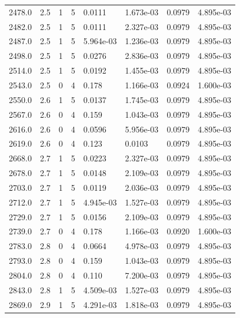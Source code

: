\documentclass[preview]{standalone}
\begin{document}
{{{{\begin{tabular}{L{1.2cm}C{1.2cm} C{0.3cm}C{0.5cm} C{1.4cm}C{1.4cm} C{1.4cm}C{1.4cm}}
  2478.0  &   2.5  & 1     &  5 &  0.0111  & 1.673e-03  & 0.0979 &  4.895e-03   \\ 
  2482.0  &   2.5  & 1     &  5 &  0.0111  & 2.327e-03  & 0.0979 &  4.895e-03   \\ 
  2487.0  &   2.5  & 1     &  5 &  5.964e-03  & 1.236e-03  & 0.0979 &  4.895e-03   \\ 
  2498.0  &   2.5  & 1     &  5 &  0.0276  & 2.836e-03  & 0.0979 &  4.895e-03   \\ 
  2514.0  &   2.5  & 1     &  5 &  0.0192  & 1.455e-03  & 0.0979 &  4.895e-03   \\ 
  2543.0  &   2.5  & 0     &  4 &  0.178  & 1.166e-03  & 0.0924 &  1.600e-03   \\ 
  2550.0  &   2.6  & 1     &  5 &  0.0137  & 1.745e-03  & 0.0979 &  4.895e-03   \\ 
  2567.0  &   2.6  & 0     &  4 &  0.159  & 1.043e-03  & 0.0979 &  4.895e-03   \\ 
  2616.0  &   2.6  & 0     &  4 &  0.0596  & 5.956e-03  & 0.0979 &  4.895e-03   \\ 
  2619.0  &   2.6  & 0     &  4 &  0.123  & 0.0103  & 0.0979 &  4.895e-03   \\ 
  2668.0  &   2.7  & 1     &  5 &  0.0223  & 2.327e-03  & 0.0979 &  4.895e-03   \\ 
  2678.0  &   2.7  & 1     &  5 &  0.0148  & 2.109e-03  & 0.0979 &  4.895e-03   \\ 
  2703.0  &   2.7  & 1     &  5 &  0.0119  & 2.036e-03  & 0.0979 &  4.895e-03   \\ 
  2712.0  &   2.7  & 1     &  5 &  4.945e-03  & 1.527e-03  & 0.0979 &  4.895e-03   \\ 
  2729.0  &   2.7  & 1     &  5 &  0.0156  & 2.109e-03  & 0.0979 &  4.895e-03   \\ 
  2739.0  &   2.7  & 0     &  4 &  0.178  & 1.166e-03  & 0.0920 &  1.600e-03   \\ 
  2783.0  &   2.8  & 0     &  4 &  0.0664  & 4.978e-03  & 0.0979 &  4.895e-03   \\ 
  2793.0  &   2.8  & 0     &  4 &  0.159  & 1.043e-03  & 0.0979 &  4.895e-03   \\ 
  2804.0  &   2.8  & 0     &  4 &  0.110  & 7.200e-03  & 0.0979 &  4.895e-03   \\ 
  2843.0  &   2.8  & 1     &  5 &  4.509e-03  & 1.527e-03  & 0.0979 &  4.895e-03   \\ 
  2869.0  &   2.9  & 1     &  5 &  4.291e-03  & 1.818e-03  & 0.0979 &  4.895e-03   \\ 

\end{tabular}}}}}
\end{document}
